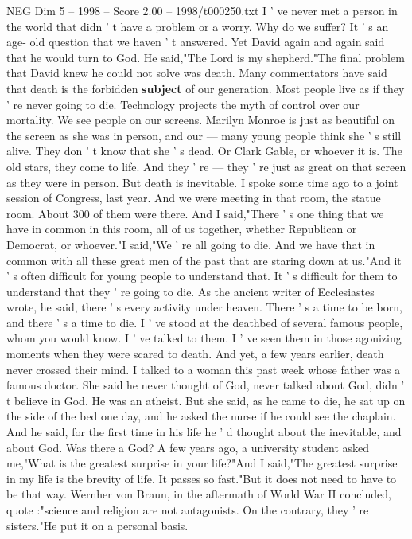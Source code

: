 \begin{textsample}{NEG Dim 5 – 1998 – Score 2.00 – 1998/t000250.txt}
I ' ve never met a person in the world that didn ' t have a problem or a worry.
Why do we suffer?
It ' s an age- old question that we haven ' t answered.
Yet David again and again said that he would turn to God.
He said,"The Lord is my shepherd."The final problem that David knew he could not solve was death.
Many commentators have said that death is the forbidden \textbf{subject} of our generation.
Most people live as if they ' re never going to die.
Technology projects the myth of control over our mortality.
We see people on our screens.
Marilyn Monroe is just as beautiful on the screen as she was in person, and our — many young people think she ' s still alive.
They don ' t know that she ' s dead.
Or Clark Gable, or whoever it is.
The old stars, they come to life.
And they ' re — they ' re just as great on that screen as they were in person.
But death is inevitable.
I spoke some time ago to a joint session of Congress, last year.
And we were meeting in that room, the statue room.
About 300 of them were there.
And I said,"There ' s one thing that we have in common in this room, all of us together, whether Republican or Democrat, or whoever."I said,"We ' re all going to die.
And we have that in common with all these great men of the past that are staring down at us."And it ' s often difficult for young people to understand that.
It ' s difficult for them to understand that they ' re going to die.
As the ancient writer of Ecclesiastes wrote, he said, there ' s every activity under heaven.
There ' s a time to be born, and there ' s a time to die.
I ' ve stood at the deathbed of several famous people, whom you would know.
I ' ve talked to them.
I ' ve seen them in those agonizing moments when they were scared to death.
And yet, a few years earlier, death never crossed their mind.
I talked to a woman this past week whose father was a famous doctor.
She said he never thought of God, never talked about God, didn ' t believe in God.
He was an atheist.
But she said, as he came to die, he sat up on the side of the bed one day, and he asked the nurse if he could see the chaplain.
And he said, for the first time in his life he ' d thought about the inevitable, and about God.
Was there a God?
A few years ago, a university student asked me,"What is the greatest surprise in your life?"And I said,"The greatest surprise in my life is the brevity of life.
It passes so fast."But it does not need to have to be that way.
Wernher von Braun, in the aftermath of World War II concluded, quote :"science and religion are not antagonists.
On the contrary, they ' re sisters."He put it on a personal basis.

\end{textsample}
